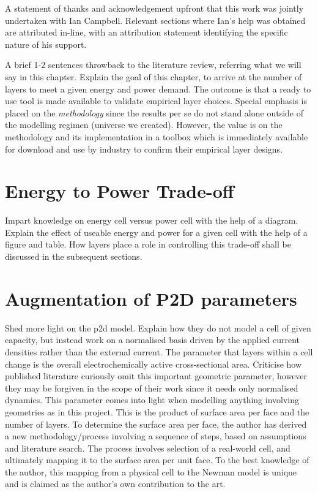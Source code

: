 A statement  of thanks and  acknowledgement upfront  that this work  was jointly
undertaken with  Ian Campbell. Relevant  sections where Ian's help  was obtained
are attributed in-line,  with an attribution statement  identifying the specific
nature of his support.

A brief 1-2 sentences throwback to the literature review, referring what we will
say in this chapter.  Explain the goal of this chapter, to  arrive at the number
of layers to meet  a given energy and power demand. The outcome  is that a ready
to  use tool  is made  available to  validate empirical  layer choices.  Special
emphasis is  placed on the  \emph{methodology} since the  results per se  do not
stand alone outside of the modelling regimen (universe we created). However, the
value  is on  the  methodology and  its  implementation in  a  toolbox which  is
immediately  available  for  download  and  use by  industry  to  confirm  their
empirical layer designs.



\section{Energy to Power Trade-off}
Impart knowledge on  energy cell versus power  cell with the help  of a diagram.
Explain the effect of useable energy and power for a given cell with the help of
a figure and table. How layers place  a role in controlling this trade-off shall
be discussed in the subsequent sections.

\section{Augmentation of P2D parameters}

Shed more light on the p2d model. Explain  how they do not model a cell of given
capacity, but instead  work on a normalised basis driven  by the applied current
densities rather than  the external current. The parameter that  layers within a
cell  change  is  the  overall electrochemically  active  cross-sectional  area.
Criticise  how  published literature  curiously  omit  this important  geometric
parameter, however  they may  be forgiven in  the scope of  their work  since it
needs only normalised  dynamics. This parameter comes into  light when modelling
anything involving geometries as in this project. This is the product of surface
area per face and the number of  layers. To determine the surface area per face,
the author has derived a new  methodology/process involving a sequence of steps,
based on assumptions and literature search.  The process involves selection of a
real-world cell, and ultimately mapping it to the surface area per unit face. To
the best  knowledge of  the author,  this mapping  from a  physical cell  to the
Newman model is  unique and is claimed  as the author's own  contribution to the
art.

